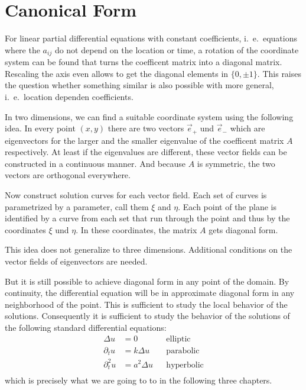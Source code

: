 %
%
%
\section{Canonical Form}
For linear partial differential equations with constant coefficients,
i.~e.~equations where the $a_{ij}$ do not depend on the location or time,
a rotation of the coordinate system can be found that turns the coefficent
matrix into a diagonal matrix.
Rescaling the axis even allows to get the diagonal elements in $\{0,\pm1\}$.
This raises the question whether something similar is also possible with
more general, i.~e.~location dependen coefficients.

In two dimensions, we can find a suitable coordinate system using the
following idea.
In every point $(x,y)$ there are two vectors $\vec e_+$ und $\vec e_-$
which are eigenvectors for the larger and the smaller eigenvalue of the
coefficent matrix $A$ respectively.
At least if the eigenvalues are different, these vector fields can be
constructed in a continuous manner.
And because $A$ is symmetric, the two vectors are orthogonal everywhere.

Now construct solution curves for each vector field.
Each set of curves is parametrized by a parameter, call them $\xi$ and $\eta$.
Each point of the plane is identified by a curve from each set that
run through the point and thus by the coordinates $\xi$ und $\eta$.
In these coordinates, the matrix $A$ gets diagonal form.

This idea does not generalize to three dimensions.
Additional conditions on the vector fields of eigenvectors are needed.

But it is still possible to achieve diagonal form in any point of the
domain.
By continuity, the differential equation will be in approximate diagonal
form in any neighborhood of the point.
This is sufficient to study the local behavior of the solutions.
Consequently it is sufficient to study the behavior of the solutions
of the following standard differential equations:
\begin{align*}
\Delta u&=0&&\text{elliptic}\\
\partial_tu&=k\Delta u&&\text{parabolic}\\
\partial_t^2u&=a^2\Delta u&&\text{hyperbolic}\\
\end{align*}
which is precisely what we are going to to in the following three chapters.

